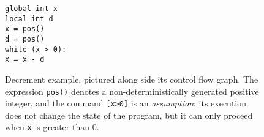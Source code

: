\documentclass[9pt,nocopyrightspace]{sigplanconf}
\theoremstyle{definition}
\begin{document}
\begin{figure}
  \begin{minipage}[b]{2.4cm}
    \texttt{global int x}\\
    \texttt{local int d}\\
    \texttt{x = pos()}\\
    \texttt{d = pos()}\\
      \texttt{while (x > 0):}\\
      \hspace*{0.25cm}\texttt{x = x - d}
  \end{minipage}
  \hfill
  \begin{minipage}[b]{6cm}
    \flushright
  \end{minipage}
\caption{Decrement example, pictured along side its control flow graph.  The
  expression \texttt{pos()} denotes a non-deterministically generated positive
  integer, and the command \texttt{[x>0]} is an \emph{assumption}; its execution does not change the state of the program, but it can only proceed when \texttt{x} is greater than 0. \label{fig:incdec}}
\end{figure}
\end{document}
